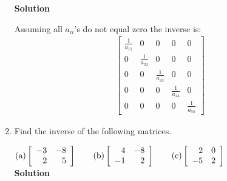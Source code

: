 \begin{enumerate}
\noindent \textbf{Solution}

\noindent Assuming all $a_{ii}$'s do not equal zero the inverse
is:
\begin{eqnarray*}
\left [\begin{array}{rrrrr}
                        \frac{1}{a_{11}}&0&0&0&0\\
                        0&\frac{1}{a_{22}}&0&0&0\\
                        0&0&\frac{1}{a_{33}}&0&0\\
                        0&0&0&\frac{1}{a_{44}}&0\\
                        0&0&0&0&\frac{1}{a_{55}} \end{array} \right ]
\end{eqnarray*}

\item Find the inverse of the following matrices.

$\rm{(a)} \left [ \begin{array}{rr} -3&-8\\2&5 \end{array} \right
] \quad \quad  \rm{(b)} \left [ \begin{array}{rr} 4&-8\\-1&2
\end{array} \right ] \quad \quad \rm{(c)} \left [ \begin{array}{rr} 2&0\\-5&2\end{array}
\right ]$\\

\noindent \textbf{Solution}


\end{enumerate}
